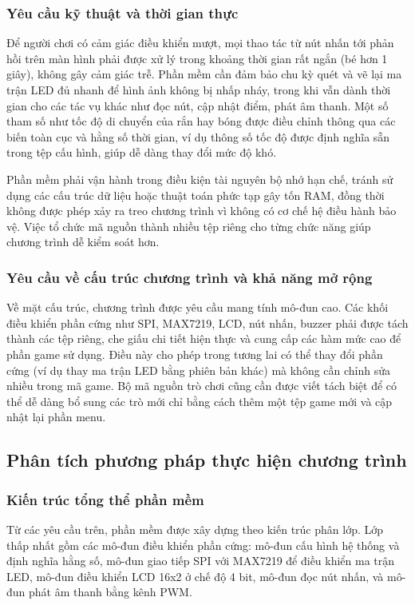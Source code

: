 \subsubsection{Yêu cầu kỹ thuật và thời gian thực}
Để người chơi có cảm giác điều khiển mượt, mọi thao tác từ nút nhấn tới phản hồi trên màn hình phải được xử lý trong khoảng thời gian rất ngắn (bé hơn 1 giây), không gây cảm giác trễ. Phần mềm cần đảm bảo chu kỳ quét và vẽ lại ma trận LED đủ nhanh để hình ảnh không bị nhấp nháy, trong khi vẫn dành thời gian cho các tác vụ khác như đọc nút, cập nhật điểm, phát âm thanh. Một số tham số như tốc độ di chuyển của rắn hay bóng được điều chỉnh thông qua các biến toàn cục và hằng số thời gian, ví dụ thông số tốc độ được định nghĩa sẵn trong tệp cấu hình, giúp dễ dàng thay đổi mức độ khó. 

Phần mềm phải vận hành trong điều kiện tài nguyên bộ nhớ hạn chế, tránh sử dụng các cấu trúc dữ liệu hoặc thuật toán phức tạp gây tốn RAM, đồng thời không được phép xảy ra treo chương trình vì không có cơ chế hệ điều hành bảo vệ. Việc tổ chức mã nguồn thành nhiều tệp riêng cho từng chức năng giúp chương trình dễ kiểm soát hơn.
\subsubsection{Yêu cầu về cấu trúc chương trình và khả năng mở rộng}
Về mặt cấu trúc, chương trình được yêu cầu mang tính mô-đun cao. Các khối điều khiển phần cứng như SPI, MAX7219, LCD, nút nhấn, buzzer phải được tách thành các tệp riêng, che giấu chi tiết hiện thực và cung cấp các hàm mức cao để phần game sử dụng. Điều này cho phép trong tương lai có thể thay đổi phần cứng (ví dụ thay ma trận LED bằng phiên bản khác) mà không cần chỉnh sửa nhiều trong mã game. Bộ mã nguồn trò chơi cũng cần được viết tách biệt để có thể dễ dàng bổ sung các trò mới chỉ bằng cách thêm một tệp game mới và cập nhật lại phần menu.
\subsection{Phân tích phương pháp thực hiện chương trình}
\subsubsection{Kiến trúc tổng thể phần mềm}
Từ các yêu cầu trên, phần mềm được xây dựng theo kiến trúc phân lớp. Lớp thấp nhất gồm các mô-đun điều khiển phần cứng: mô-đun cấu hình hệ thống và định nghĩa hằng số, mô-đun giao tiếp SPI với MAX7219 để điều khiển ma trận LED, mô-đun điều khiển LCD 16x2 ở chế độ 4 bit, mô-đun đọc nút nhấn, và mô-đun phát âm thanh bằng kênh PWM. 

